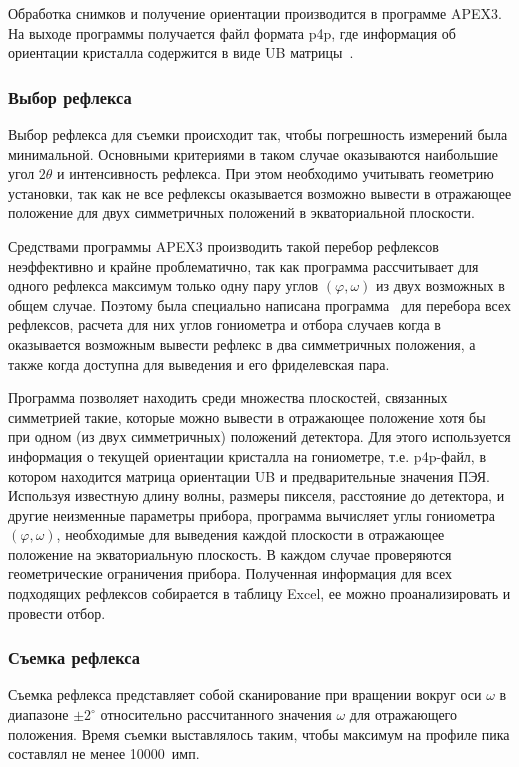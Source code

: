 \documentclass[a4paper,14pt]{extarticle}
\newcommand{\degree}{^\circ}
\begin{document}
Обработка снимков и получение ориентации производится в программе APEX3.
На выходе программы получается файл формата p4p, где информация об ориентации кристалла содержится в виде UB матрицы~\cite{Busing:1967}.
\subsubsection{Выбор рефлекса}
Выбор рефлекса для съемки происходит так, чтобы погрешность измерений была минимальной.
Основными критериями в таком случае оказываются наибольшие угол $2\theta$ и интенсивность рефлекса.
При этом необходимо учитывать геометрию установки, так как не все рефлексы оказывается возможно вывести в отражающее положение для двух симметричных положений в экваториальной плоскости.

Средствами программы APEX3 производить такой перебор рефлексов неэффективно и крайне проблематично, так как программа рассчитывает для одного рефлекса максимум только одну пару углов $(\varphi, \omega)$ из двух возможных в общем случае.
Поэтому была специально написана программа~\cite{Kudryavtsev:2024:eccentr} для перебора всех рефлексов, расчета для них углов гониометра и отбора случаев когда в оказывается возможным вывести рефлекс в два симметричных положения, а также когда доступна для выведения и его фриделевская пара.

Программа позволяет находить среди множества плоскостей, связанных симметрией такие, которые можно вывести в отражающее положение хотя бы при одном (из двух симметричных) положений детектора.
Для этого используется информация о текущей ориентации кристалла на гониометре, т.е. p4p-файл, в котором находится матрица ориентации UB и предварительные значения ПЭЯ.
Используя известную длину волны, размеры пикселя, расстояние до детектора, и другие неизменные параметры прибора, программа вычисляет углы гониометра $(\varphi, \omega)$, необходимые для выведения каждой плоскости в отражающее положение на экваториальную плоскость.
В каждом случае проверяются геометрические ограничения прибора.
Полученная информация для всех подходящих рефлексов собирается в таблицу Excel, ее можно проанализировать и провести отбор.
\subsubsection{Съемка рефлекса}
Съемка рефлекса представляет собой сканирование при вращении вокруг оси $\omega$ в диапазоне $\pm 2\degree$ относительно рассчитанного значения $\omega$ для отражающего положения.
Время съемки выставлялось таким, чтобы максимум на профиле пика составлял не менее 10000~имп.
\end{document}
